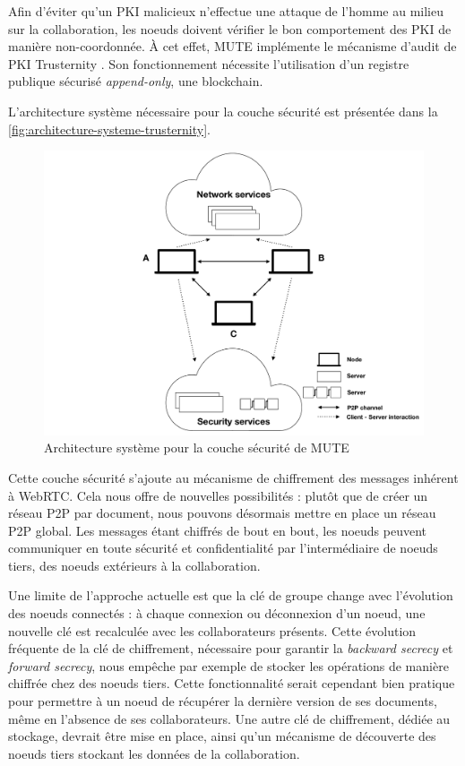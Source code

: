 Afin d'éviter qu'un \ac{PKI} malicieux n'effectue une attaque de l'homme au milieu sur la collaboration, les noeuds doivent vérifier le bon comportement des PKI de manière non-coordonnée.
À cet effet, MUTE implémente le mécanisme d'audit de PKI Trusternity \cite{2018-trusternity-short, 2018-trusternity-long}.
Son fonctionnement nécessite l'utilisation d'un registre publique sécurisé \emph{append-only}, \ie une blockchain.

L'architecture système nécessaire pour la couche sécurité est présentée dans la \autoref{fig:architecture-systeme-trusternity}.

\begin{figure}[!ht]
  \centering
  \includegraphics[page=4, trim=3cm 1cm 4cm 1cm, clip, width=.7\linewidth]{img/mute-figures.pdf}
  \caption{Architecture système pour la couche sécurité de MUTE}
  \label{fig:architecture-systeme-trusternity}
\end{figure}

Cette couche sécurité s'ajoute au mécanisme de chiffrement des messages inhérent à \ac{WebRTC}.
Cela nous offre de nouvelles possibilités : plutôt que de créer un réseau \ac{P2P} par document, nous pouvons désormais mettre en place un réseau \ac{P2P} global.
Les messages étant chiffrés de bout en bout, les noeuds peuvent communiquer en toute sécurité et confidentialité par l'intermédiaire de noeuds tiers, \ie des noeuds extérieurs à la collaboration.

Une limite de l'approche actuelle est que la clé de groupe change avec l'évolution des noeuds connectés : à chaque connexion ou déconnexion d'un noeud, une nouvelle clé est recalculée avec les collaborateurs présents.
Cette évolution fréquente de la clé de chiffrement, nécessaire pour garantir la \emph{backward secrecy} et \emph{forward secrecy}, nous empêche par exemple de stocker les opérations de manière chiffrée chez des noeuds tiers.
Cette fonctionnalité serait cependant bien pratique pour permettre à un noeud de récupérer la dernière version de ses documents, même en l'absence de ses collaborateurs.
Une autre clé de chiffrement, dédiée au stockage, devrait être mise en place, ainsi qu'un mécanisme de découverte des noeuds tiers stockant les données de la collaboration.

